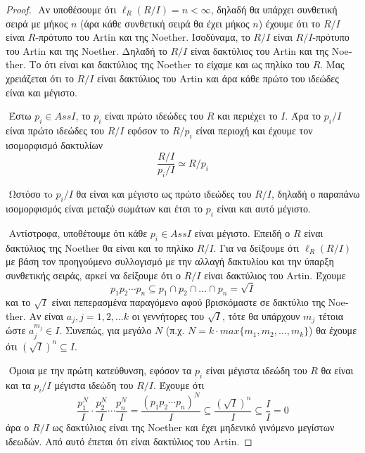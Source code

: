 \documentclass[oneside,a4paper]{article}
\newcommand {\tl}{\textlatin}
\begin{document}
\begin{proof}
	$ $\newline
	Αν υποθέσουμε ότι $\ell_R (R/I) = n < \infty$, δηλαδή θα υπάρχει συνθετική σειρά με μήκος $n$ (άρα κάθε συνθετική σειρά θα έχει μήκος $n$) έχουμε ότι το $R/I$ είναι $R$-πρότυπο του \tl{Artin} και της \tl{Noether}. Ισοδύναμα, το $R/I$ είναι $R/I$-πρότυπο του \tl{Artin} και της \tl{Noether}. Δηλαδή το $R/I$ είναι δακτύλιος του \tl{Artin} και της \tl{Noether}. Το ότι είναι και δακτύλιος της \tl{Noether} το είχαμε και ως πηλίκο του $R$. Μας χρειάζεται ότι το $R/I$ είναι δακτύλιος του \tl{Artin} και άρα κάθε πρώτο του ιδεώδες είναι και μέγιστο.

	$ $\newline
	Έστω $p_i \in AssI$, το $p_i$ είναι πρώτο ιδεώδες του $R$ και περιέχει το $I$. Άρα το $p_i/I$ είναι πρώτο ιδεώδες του $R/I$ εφόσον το $R/p_i$ είναι περιοχή και έχουμε τον ισομορφισμό δακτυλίων $$\frac{R/I}{p_i/I} \simeq R/p_i $$

	$ $\newline
	Ωστόσο τo $p_i/I$ θα είναι και μέγιστο ως πρώτο ιδεώδες του $R/I$, δηλαδή ο παραπάνω ισομορφισμός είναι μεταξύ σωμάτων και έτσι το $p_i$ είναι και αυτό μέγιστο.

	$ $\newline
	Αντίστροφα, υποθέτουμε ότι κάθε $p_i \in AssI$ είναι μέγιστο. Επειδή ο $R$ είναι δακτύλιος της \tl{Noether} θα είναι και το πηλίκο $R/I$. Για να δείξουμε ότι $\ell_R(R/I)$ με βάση τον προηγούμενο συλλογισμό με την αλλαγή δακτυλίου και την ύπαρξη συνθετικής σειράς, αρκεί να δείξουμε ότι ο $R/I$ είναι δακτύλιος του \tl{Artin}. Έχουμε $$p_1 p_2 \cdots p_n \subseteq p_1 \cap p_2 \cap \ldots \cap p_n = \sqrt{I}$$ και το $\sqrt{I}$ είναι πεπερασμένα παραγόμενο αφού βρισκόμαστε σε δακτύλιο της \tl{Noether}. Αν είναι $a_j, j = 1,2,\ldots k$ οι γεννήτορες του $\sqrt{I}$, τότε θα υπάρχουν $m_j$ τέτοια ώστε $a^{m_j}_j \in I$. Συνεπώς, για μεγάλο $N$ (π.χ. $N = k \cdot max\{m_1,m_2,\ldots,m_k\}$) θα έχουμε ότι $(\sqrt{I})^n \subseteq I$.

	$ $\newline
	Όμοια με την πρώτη κατεύθυνση, εφόσον τα $p_i$ είναι μέγιστα ιδεώδη του $R$ θα είναι και τα $p_i /I$ μέγιστα ιδεώδη του $R/I$. Έχουμε ότι $$\frac{p^N_1}I \cdot \frac{p^N_2}I \cdots \frac{p^N_n}I = \frac{(p_1 p_2 \cdots p_n)^N}{I} \subseteq \frac{(\sqrt{I})^n}{I} \subseteq \frac{I}{I} = 0$$ άρα ο $R/I$ ως δακτύλιος είναι της \tl{Noether} και έχει μηδενικό γινόμενο μεγίστων ιδεωδών. Από αυτό έπεται ότι είναι δακτύλιος του \tl{Artin}.
\end{proof}
\end{document}
